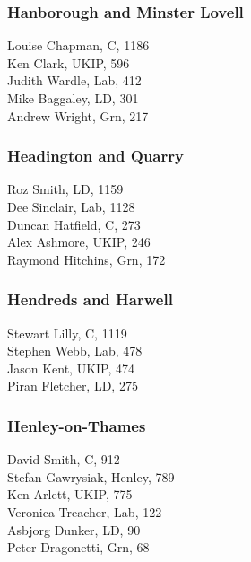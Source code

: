 \documentclass[a4paper,openany,10pt]{book}
\begin{document}
\subsubsection*{{Hanborough and Minster Lovell}}



Louise Chapman, C, 1186\\
Ken Clark, UKIP, 596\\
Judith Wardle, Lab, 412\\
Mike Baggaley, LD, 301\\
Andrew Wright, Grn, 217\\


\subsubsection*{Headington and Quarry}



Roz Smith, LD, 1159\\
Dee Sinclair, Lab, 1128\\
Duncan Hatfield, C, 273\\
Alex Ashmore, UKIP, 246\\
Raymond Hitchins, Grn, 172\\


\subsubsection*{Hendreds and Harwell}



Stewart Lilly, C, 1119\\
Stephen Webb, Lab, 478\\
Jason Kent, UKIP, 474\\
Piran Fletcher, LD, 275\\


\subsubsection*{Henley-on-Thames}



David Smith, C, 912\\
Stefan Gawrysiak, Henley, 789\\
Ken Arlett, UKIP, 775\\
Veronica Treacher, Lab, 122\\
Asbjorg Dunker, LD, 90\\
Peter Dragonetti, Grn, 68\\
\end{document}
